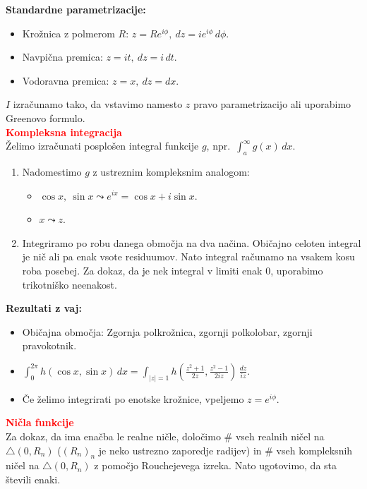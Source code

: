 \documentclass[a4paper,oneside,8pt,landscape]{extarticle}
\begin{document}
\begin{multicols*}{3}
\textbf{Standardne parametrizacije:}
\begin{itemize}
    \item Krožnica z polmerom \(R\): \(z = Re^{i \phi},\ dz = ie^{i\phi}\, d\phi\).
    \item Navpična premica: \(z = it,\ dz = i\, dt\).
    \item Vodoravna premica: \(z = x,\ dz = dx\).
\end{itemize}
\(I\) izračunamo tako, da vstavimo namesto \(z\) pravo parametrizacijo ali uporabimo Greenovo formulo.\\
\textbf{\textcolor{red}{Kompleksna integracija}}\\
Želimo izračunati posplošen integral funkcije \(g\), npr.\ \(\int_{a}^{\infty}g(x)\, dx\).
\begin{enumerate}
    \item Nadomestimo \(g\) z ustreznim kompleksnim analogom:
    \begin{itemize}
        \item \(\cos x, \ \sin x \leadsto e^{ix} = \cos x + i \sin x\).
        \item \(x \leadsto z\).
    \end{itemize}
    \item Integriramo po robu danega območja na dva načina. Običajno celoten integral je nič ali pa enak vsote residuumov. Nato integral računamo na vsakem kosu roba posebej. Za dokaz, da je nek integral v limiti enak \(0\), uporabimo trikotniško neenakost.
\end{enumerate}
\textbf{Rezultati z vaj:}
\begin{itemize}
    \item Običajna območja: Zgornja polkrožnica, zgornji polkolobar, zgornji pravokotnik.
    \item \(\int_{0}^{2\pi} h(\cos x, \sin x)\, dx = \int_{|z| = 1} h(\frac{z^2+1}{2z}, \frac{z^2-1}{2iz})\, \frac{dz}{iz}\).
    \item Če želimo integrirati po enotske krožnice, vpeljemo \(z = e^{i\phi}\).
\end{itemize}
\textbf{\textcolor{red}{Ničla funkcije}}\\
Za dokaz, da ima enačba le realne ničle, določimo \# vseh realnih ničel na \(\triangle(0, R_n)\) (\((R_n)_n\) je neko ustrezno zaporedje radijev) in \# vseh kompleksnih ničel na \(\triangle(0, R_n)\) z pomočjo Rouchejevega izreka. Nato ugotovimo, da sta števili enaki.\\

\end{multicols*}
\end{document}
